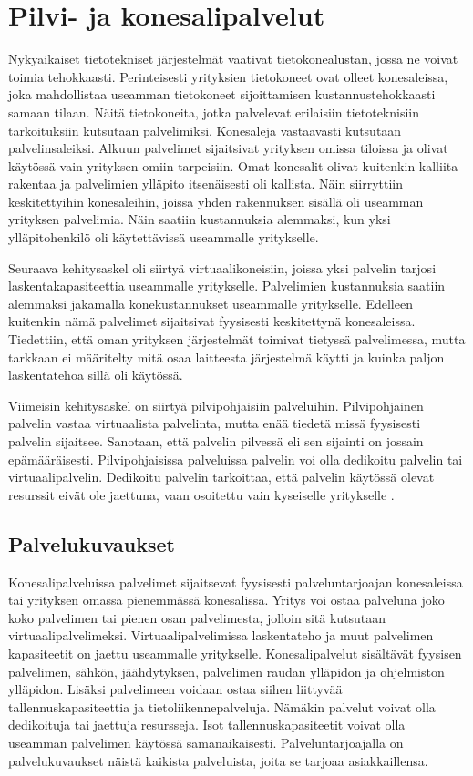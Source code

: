 \chapter{Pilvi- ja konesalipalvelut\label{konesalipalvelut}}
Nykyaikaiset tietotekniset järjestelmät vaativat tietokonealustan, jossa ne voivat toimia tehokkaasti. Perinteisesti yrityksien tietokoneet ovat olleet konesaleissa, joka mahdollistaa useamman tietokoneet sijoittamisen kustannustehokkaasti samaan tilaan. Näitä tietokoneita, jotka palvelevat erilaisiin tietoteknisiin tarkoituksiin kutsutaan palvelimiksi. \citep{server_computing} Konesaleja vastaavasti kutsutaan palvelinsaleiksi. Alkuun palvelimet sijaitsivat yrityksen omissa tiloissa ja olivat käytössä vain yrityksen omiin tarpeisiin. Omat konesalit olivat kuitenkin kalliita rakentaa ja palvelimien ylläpito itsenäisesti oli kallista. Näin siirryttiin keskitettyihin konesaleihin, joissa yhden rakennuksen sisällä oli useamman yrityksen palvelimia. Näin saatiin kustannuksia alemmaksi, kun yksi ylläpitohenkilö oli käytettävissä useammalle yritykselle. \citep{server_room}

Seuraava kehitysaskel oli siirtyä virtuaalikoneisiin, joissa yksi palvelin tarjosi laskentakapasiteettia useammalle yritykselle. Palvelimien kustannuksia saatiin alemmaksi jakamalla konekustannukset useammalle yritykselle. Edelleen kuitenkin nämä palvelimet sijaitsivat fyysisesti keskitettynä konesaleissa. Tiedettiin, että oman yrityksen järjestelmät toimivat tietyssä palvelimessa, mutta tarkkaan ei määritelty mitä osaa laitteesta järjestelmä käytti ja kuinka paljon laskentatehoa sillä oli käytössä.\citep{virtual_server}

Viimeisin kehitysaskel on siirtyä pilvipohjaisiin palveluihin. Pilvipohjainen palvelin vastaa virtuaalista palvelinta, mutta enää tiedetä missä fyysisesti palvelin sijaitsee. \citep{cloud_computing} Sanotaan, että palvelin pilvessä eli sen sijainti on jossain epämääräisesti. Pilvipohjaisissa palveluissa palvelin voi olla dedikoitu palvelin tai virtuaalipalvelin. Dedikoitu palvelin tarkoittaa, että palvelin käytössä olevat resurssit eivät ole jaettuna, vaan osoitettu vain kyseiselle yritykselle \citep{dedicated_hosting}.

\section{Palvelukuvaukset}
Konesalipalveluissa palvelimet sijaitsevat fyysisesti palveluntarjoajan konesaleissa tai yrityksen omassa pienemmässä konesalissa. Yritys voi ostaa palveluna joko koko palvelimen tai pienen osan palvelimesta, jolloin sitä kutsutaan virtuaalipalvelimeksi. Virtuaalipalvelimissa laskentateho ja muut palvelimen kapasiteetit on jaettu useammalle yritykselle. Konesalipalvelut sisältävät fyysisen palvelimen, sähkön, jäähdytyksen, palvelimen raudan ylläpidon ja ohjelmiston ylläpidon. Lisäksi palvelimeen voidaan ostaa siihen liittyvää tallennuskapasiteettia ja tietoliikennepalveluja. Nämäkin palvelut voivat olla dedikoituja tai jaettuja resursseja. Isot tallennuskapasiteetit voivat olla useamman palvelimen käytössä samanaikaisesti. Palveluntarjoajalla on palvelukuvaukset näistä kaikista palveluista, joita se tarjoaa asiakkaillensa. \citep{handbook}

